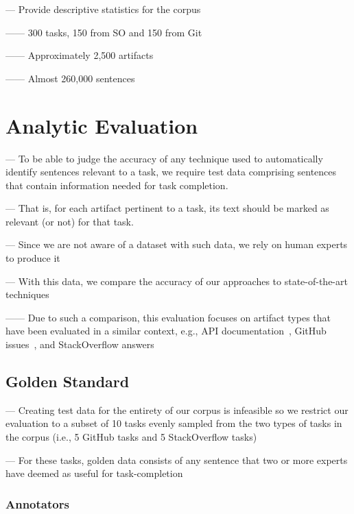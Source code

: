 --- Provide descriptive statistics for the corpus

------ 300 tasks, 150 from SO and 150 from Git

------ Approximately 2,500 artifacts

------ Almost 260,000 sentences


\section{Analytic Evaluation}

--- To be able to judge the accuracy of any technique used to automatically identify sentences relevant to a task,
we require test data comprising sentences that contain information needed for task completion. \vspace{3mm}


--- That is, for each artifact pertinent to a task, its text should be marked as relevant (or not) for that task. \vspace{3mm}

--- Since we are not aware of a dataset with such data, we rely on human experts to produce it \vspace{3mm}


--- With this data, we compare the accuracy of our approaches to state-of-the-art techniques

------ Due to such a comparison, this evaluation focuses on artifact types that have been evaluated in a similar context, e.g., API documentation~\cite{Robillard2015}, GitHub issues~\cite{Lotufo2012}, and StackOverflow answers~\cite{Xu2017}



\subsection{Golden Standard}

--- Creating test data for the entirety of our corpus is infeasible so we restrict our evaluation to a subset of 10 tasks evenly sampled from the two types of tasks in the corpus (i.e., 5 GitHub tasks and 5 StackOverflow tasks) \vspace{3mm}

--- For these tasks, golden data consists of any sentence that two or more experts have deemed as useful for task-completion \vspace{3mm}



\subsubsection{Annotators}


